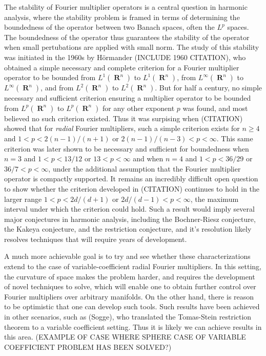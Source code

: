 \documentclass[12pt]{article}
\DeclareMathOperator{\RR}{\mathbf{R}}
\theoremstyle{plain}
\theoremstyle{remark}
\theoremstyle{definition}
\begin{document}

The stability of Fourier multiplier operators is a central question in harmonic analysis, where the stability problem is framed in terms of determining the boundedness of the operator between two Banach spaces, often the $L^p$ spaces. The boundedness of the operator thus guarantees the stability of the operator when small pertubations are applied with small norm. The study of this stability was initiated in the 1960s by H\"{o}rmander (INCLUDE 1960 CITATION), who obtained a simple necessary and complete criterion for a Fourier multiplier operator to be bounded from $L^1(\RR^n)$ to $L^1(\RR^n)$, from $L^\infty(\RR^n)$ to $L^\infty(\RR^n)$, and from $L^2(\RR^n)$ to $L^2(\RR^n)$. But for half a century, no simple necessary and sufficient criterion ensuring a multiplier operator to be bounded from $L^p(\RR^n)$ to $L^p(\RR^n)$ for any other exponent $p$ was found, and most believed no such criterion existed. Thus it was surpising when (CITATION) showed that for \emph{radial} Fourier multipliers, such a simple criterion exists for $n \geq 4$ and $1 < p < 2(n-1)/(n+1)$ or $2(n-1)/(n-3) < p < \infty$. This same criterion was later shown to be necessary and sufficient for boundedness when $n = 3$ and $1 < p < 13/12$ or $13 < p < \infty$ and when $n = 4$ and $1 < p < 36/29$ or $36/7 < p < \infty$, under the additional assumption that the Fourier multiplier operator is compactly supported. It remains an incredibly difficult open question to show whether the criterion developed in (CITATION) continues to hold in the larger range $1 < p < 2d/(d+1)$ or $2d/(d-1) < p < \infty$, the maximum interval under which the criterion could hold. Such a result would imply several major conjectures in harmonic analysis, including the Bochner-Riesz conjecture, the Kakeya conjecture, and the restriction conjecture, and it's resolution likely resolves techniques that will require years of development.

A much more achievable goal is to try and see whether these characterizations extend to the case of variable-coefficient radial Fourier multipliers. In this setting, the curvature of space makes the problem harder, and requires the development of novel techniques to solve, which will enable one to obtain further control over Fourier multipliers over arbitrary manifolds. On the other hand, there is reason to be optimistic that one can develop such tools. Such results have been achieved in other scenarios, such as (Sogge), who translated the Tomas-Stein restriction theorem to a variable coefficient setting. Thus it is likely we can achieve results in this area. (EXAMPLE OF CASE WHERE SPHERE CASE OF VARIABLE COEFFICIENT PROBLEM HAS BEEN SOLVED?)



 
\end{document}
